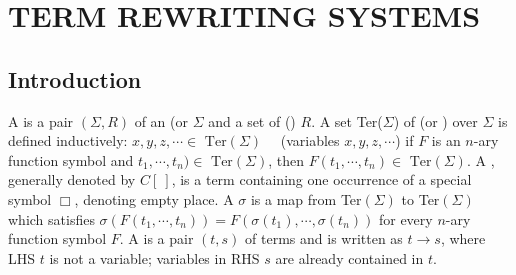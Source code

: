 \section{TERM REWRITING SYSTEMS}
\subsection{Introduction}
\bit
\w A  is a pair $(\Sigma, R)$ of an  (or
 $\Sigma$ and a set of  () $R$. 
\w A set Ter($\Sigma$) of  (or ) over $\Sigma$ is
defined inductively:
  \ben
  \w [(a)] $x, y, z, \cdots \in \mbox{\ Ter}(\Sigma)$ \ \ (variables $x, y, z,
  \cdots$) 
  \w [(b)] if $F$ is an $n$-ary function symbol and $t_1, \cdots, t_n) \in
  \mbox{\ Ter}(\Sigma)$, then $F(t_1, \cdots, t_n) \in \mbox{\ Ter}(\Sigma)$.
  \een
\w A , generally denoted by $C[\ ]$, is a term containing one
occurrence of a special symbol $\Box$, denoting empty place. 
\w A  $\sigma$ is a map from Ter$(\Sigma)$ to Ter$(\Sigma)$
which satisfies $\sigma(F(t_1, \cdots, t_n)) = F(\sigma(t_1), \cdots,
\sigma(t_n))$ for every $n$-ary function symbol $F$. 
\w A  is a pair $(t, s)$ of terms and is written as $t
\rightarrow s$, where
   \ben
   \w [(a)] LHS $t$ is not a variable;
   \w [(b)] variables in RHS $s$ are already contained in $t$.
   \een

\eit